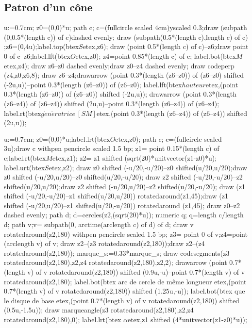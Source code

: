 \subsection{Patron d'un cône}\begin{center}
    \hfill
    \begin{Geometrie}[CoinBG={(-4u,-2u)}]
        u:=0.7cm;
        z0=(0,0)*u;
        path c;
        c=(fullcircle scaled 4cm)yscaled 0.3;draw  (subpath (0,0.5*(length c)) of c)dashed evenly;
        draw (subpath(0.5*(length c),length c) of c)  ;z6=(0,4u);label.top(btex$S$etex,z6);
        draw (point 0.5*(length c) of c)--z6;draw point 0 of c--z6;label.lft(btex$O$etex,z0);
        z4=point 0.85*(length c) of c; label.bot(btex$M$etex,z4);
        draw z6--z0 dashed evenly;draw z0--z4 dashed evenly; draw codeperp (z4,z0,z6,8);
        draw z6--z4;drawarrow (point 0.3*(length (z6--z0)) of (z6--z0) shifted (-2u,u))--point 0.3*(length (z6--z0)) of (z6--z0);
        label.lft(btex$ hauteur$etex,(point 0.3*(length (z6--z0)) of (z6--z0)) shifted (-2u,u));
        drawarrow (point 0.3*(length (z6--z4)) of (z6--z4)) shifted (2u,u)--point 0.3*(length (z6--z4)) of (z6--z4);
        label.rt(btex$ g\acute{e}n\acute{e}ratrice\ \left[SM\right]$etex,(point 0.3*(length (z6--z4)) of (z6--z4)) shifted (2u,u));
    \end{Geometrie}
    \hfill
    \begin{Geometrie}[CoinBG={(-4u,-2u)}]
        u:=0.7cm;
        z0=(0,0)*u;label.lrt(btex$O$etex,z0);
        path c;
        c=(fullcircle scaled 3u);draw c withpen pencircle scaled 1.5 bp;
        z1= point 0.15*(length c) of c;label.rt(btex$M$etex,z1);
        z2= z1 shifted (sqrt(20)*unitvector(z1-z0)*u);
        label.urt(btex$S$etex,z2);
        draw z0 shifted (-u/20,-u/20)--z0 shifted(u/20,u/20);draw z0 shifted (-u/20,u/20)--z0 shifted(u/20,-u/20);
        draw z2 shifted (-u/20,-u/20)--z2 shifted(u/20,u/20);draw z2 shifted (-u/20,u/20)--z2 shifted(u/20,-u/20);
        draw (z1 shifted (-u/20,-u/20)--z1 shifted(u/20,u/20)) rotatedaround(z1,45);draw (z1 shifted (-u/20,u/20)--z1 shifted(u/20,-u/20)) rotatedaround (z1,45);
        draw z0--z2 dashed evenly;
        path d;
        d=cercles(z2,(sqrt(20)*u));
        numeric q; q=length c/length d;
        path v;v= subpath(0, arctime(arclength c) of d) of d;
        draw v rotatedaround(z2,180) withpen pencircle scaled 1.5 bp;
        z3= point 0 of v;z4=point (arclength v) of v;
        draw z2--(z3 rotatedaround(z2,180));draw z2--(z4 rotatedaround(z2,180));
        marque_s:=0.33*marque_s;
        draw codesegments(z3 rotatedaround(z2,180),z2,z4 rotatedaround(z2,180),z2,2);
        drawarrow (point 0.7*(length v) of v rotatedaround(z2,180)) shifted (0.9u,-u)--point 0.7*(length v) of v rotatedaround(z2,180);
        label.bot(btex arc de cercle de même longueur etex,(point 0.7*(length v) of v rotatedaround(z2,180)) shifted (1.25u,-u));
        label.bot(btex que le disque de base etex,(point 0.7*(length v) of v rotatedaround(z2,180)) shifted (0.5u,-1.5u));
        draw marqueangle(z3 rotatedaround(z2,180),z2,z4 rotatedaround(z2,180),0);
        label.lrt(btex $\alpha$etex,z1 shifted (4*unitvector(z1-z0)*u)); 
    \end{Geometrie}
    \hfill


\end{center}
